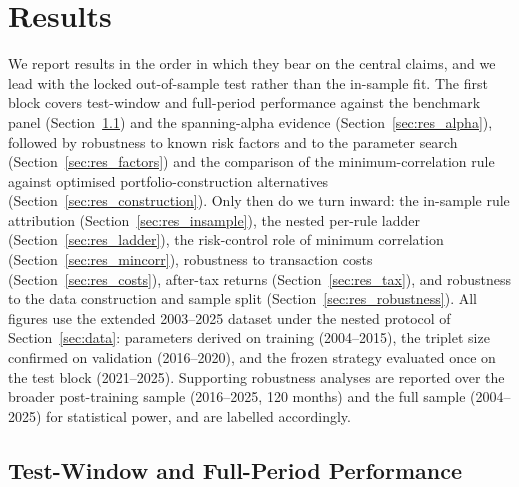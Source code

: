 \section{Results}
\label{sec:results}

We report results in the order in which they bear on the central claims, and we lead
with the locked out-of-sample test rather than the in-sample fit. The first block
covers test-window and full-period performance against the benchmark panel
(Section~\ref{sec:res_oos}) and the spanning-alpha evidence
(Section~\ref{sec:res_alpha}), followed by robustness to known risk factors and to the
parameter search (Section~\ref{sec:res_factors}) and the comparison of the
minimum-correlation rule against optimised portfolio-construction alternatives
(Section~\ref{sec:res_construction}). Only then do we turn inward: the in-sample rule
attribution (Section~\ref{sec:res_insample}), the nested per-rule ladder
(Section~\ref{sec:res_ladder}), the risk-control role of minimum correlation
(Section~\ref{sec:res_mincorr}), robustness to transaction costs
(Section~\ref{sec:res_costs}), after-tax returns (Section~\ref{sec:res_tax}), and
robustness to the data construction and sample split
(Section~\ref{sec:res_robustness}).
All figures use the extended 2003--2025 dataset under the nested protocol of
Section~\ref{sec:data}: parameters derived on training (2004--2015), the triplet
size confirmed on validation (2016--2020), and the frozen strategy evaluated once
on the test block (2021--2025). Supporting robustness analyses are reported over the
broader post-training sample (2016--2025, 120 months) and the full sample
(2004--2025) for statistical power, and are labelled accordingly.

\subsection{Test-Window and Full-Period Performance}
\label{sec:res_oos}

